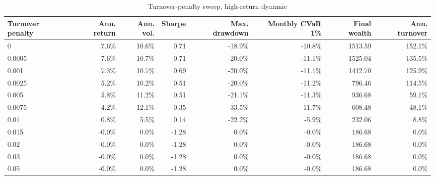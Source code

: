 \begin{table}[!htbp]
\centering
\caption{Turnover-penalty sweep, high-return dynamic}
\label{tab:allocation-turnover-penalty-high-return}
\small
\setlength{\tabcolsep}{5pt}
\renewcommand{\arraystretch}{1.12}
\begin{adjustbox}{center,max width=\linewidth}
\begin{tabular}{lrrrrrrr}
\toprule
Turnover penalty & Ann. return & Ann. vol. & Sharpe & Max. drawdown & Monthly CVaR 1\% & Final wealth & Ann. turnover \\
\midrule
0 & 7.6\% & 10.6\% & 0.71 & -18.9\% & -10.8\% & 1513.59 & 152.1\% \\
0.0005 & 7.6\% & 10.7\% & 0.71 & -20.0\% & -11.1\% & 1525.04 & 135.5\% \\
0.001 & 7.3\% & 10.7\% & 0.69 & -20.0\% & -11.1\% & 1412.70 & 125.9\% \\
0.0025 & 5.2\% & 10.2\% & 0.51 & -20.0\% & -11.2\% & 796.46 & 114.5\% \\
0.005 & 5.8\% & 11.2\% & 0.51 & -21.1\% & -11.3\% & 936.68 & 59.1\% \\
0.0075 & 4.2\% & 12.1\% & 0.35 & -33.5\% & -11.7\% & 608.48 & 48.1\% \\
0.01 & 0.8\% & 5.5\% & 0.14 & -22.2\% & -5.9\% & 232.06 & 8.8\% \\
0.015 & -0.0\% & 0.0\% & -1.28 & 0.0\% & -0.0\% & 186.68 & 0.0\% \\
0.02 & -0.0\% & 0.0\% & -1.28 & 0.0\% & -0.0\% & 186.68 & 0.0\% \\
0.03 & -0.0\% & 0.0\% & -1.28 & 0.0\% & -0.0\% & 186.68 & 0.0\% \\
0.05 & -0.0\% & 0.0\% & -1.28 & 0.0\% & -0.0\% & 186.68 & 0.0\% \\
\bottomrule
\end{tabular}
\end{adjustbox}
\end{table}